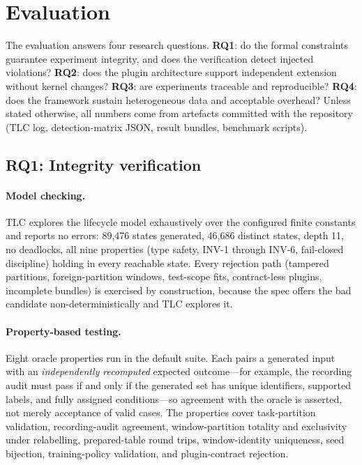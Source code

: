 \section{Evaluation}
\label{sec:eval}

The evaluation answers four research questions. \textbf{RQ1}: do the formal
constraints guarantee experiment integrity, and does the verification detect
injected violations? \textbf{RQ2}: does the plugin architecture support
independent extension without kernel changes? \textbf{RQ3}: are experiments
traceable and reproducible? \textbf{RQ4}: does the framework sustain
heterogeneous data and acceptable overhead? Unless stated otherwise, all
numbers come from artefacts committed with the repository (TLC log,
detection-matrix JSON, result bundles, benchmark scripts).

\subsection{RQ1: Integrity verification}

\paragraph{Model checking.}
TLC explores the lifecycle model exhaustively over the configured finite
constants and reports no errors: 89{,}476 states generated, 46{,}686 distinct
states, depth 11, no deadlocks, all nine properties (type safety, INV-1
through INV-6, fail-closed discipline) holding in every reachable state.
Every rejection path (tampered partitions, foreign-partition windows,
test-scope fits, contract-less plugins, incomplete bundles) is exercised by
construction, because the spec offers the bad candidate non-deterministically
and TLC explores it.

\paragraph{Property-based testing.}
Eight oracle properties run in the default suite. Each pairs a generated
input with an \emph{independently recomputed} expected outcome---for
example, the recording audit must pass if and only if the generated set has
unique identifiers, supported labels, and fully assigned conditions---so
agreement with the oracle is asserted, not merely acceptance of valid cases.
The properties cover task-partition validation, recording-audit agreement,
window-partition totality and exclusivity under relabelling, prepared-table
round trips, window-identity uniqueness, seed bijection, training-policy
validation, and plugin-contract rejection.


